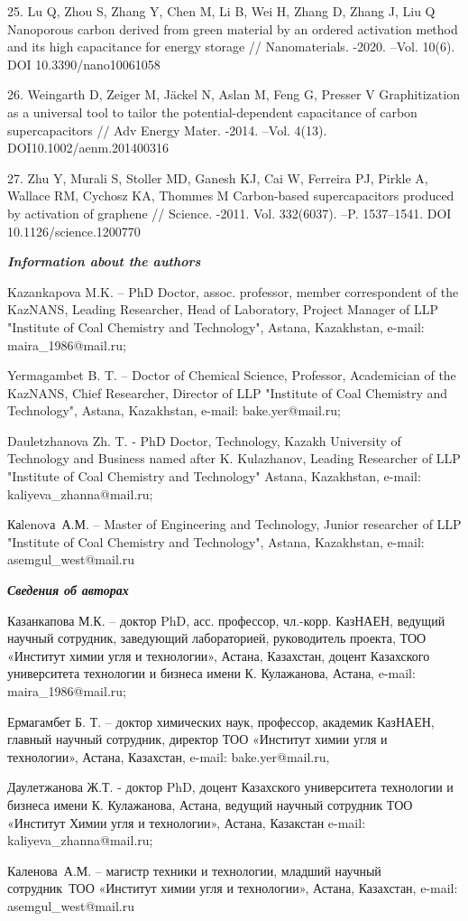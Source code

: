 25. Lu Q, Zhou S, Zhang Y, Chen M, Li B, Wei H, Zhang D, Zhang J, Liu Q
Nanoporous carbon derived from green material by an ordered activation
method and its high capacitance for energy storage // Nanomaterials.
-2020. --Vol. 10(6). DOI 10.3390/nano10061058

26. Weingarth D, Zeiger M, Jäckel N, Aslan M, Feng G, Presser V
Graphitization as a universal tool to tailor the potential-dependent
capacitance of carbon supercapacitors // Adv Energy Mater. -2014. --Vol.
4(13). DOI10.1002/aenm.201400316

27. Zhu Y, Murali S, Stoller MD, Ganesh KJ, Cai W, Ferreira PJ, Pirkle
A, Wallace RM, Cychosz KA, Thommes M Carbon-based supercapacitors
produced by activation of graphene // Science. -2011. Vol. 332(6037).
--P. 1537--1541. DOI 10.1126/science.1200770

\emph{{\bfseries Information about the authors}}

Kazankapova M.K. -- PhD Doctor, assoc. professor, member correspondent
of the KazNANS, Leading Researcher, Head of Laboratory, Project Manager
of LLP "Institute of Coal Chemistry and Technology", Astana, Kazakhstan,
e-mail: maira\_1986@mail.ru;

Yermagambet B. T. -- Doctor of Chemical Science, Professor, Academician
of the KazNANS, Chief Researcher, Director of LLP "Institute of Coal
Chemistry and Technology", Astana, Kazakhstan, e-mail: bake.yer@mail.ru;

Dauletzhanova Zh. T. - PhD Doctor, Technology, Kazakh University of
Technology and Business named after K. Kulazhanov, Leading Researcher of
LLP "Institute of Coal Chemistry and Technology" Astana, Kazakhstan,
e-mail: kaliyeva\_zhanna@mail.ru;

Каlenovа~А.М. -- Master of Engineering and Technology, Junior researcher
of LLP "Institute of Coal Chemistry and Technology", Astana, Kazakhstan,
e-mail: asemgul\_west@mail.ru ~

\emph{{\bfseries Сведения об авторах}}

Казанкапова М.К. -- доктор PhD, асс. профессор, чл.-корр. КазНАЕН,
ведущий научный сотрудник, заведующий лабораторией, руководитель
проекта, ТОО «Институт химии угля и технологии», Астана, Казахстан,
доцент Казахского университета технологии и бизнеса имени К. Кулажанова,
Астана, e-mail: maira\_1986@mail.ru;

Ермагамбет Б. Т. -- доктор химических наук, профессор, академик КазНАЕН,
главный научный сотрудник, директор ТОО «Институт химии угля и
технологии», Астана, Казахстан, e-mail: bake.yer@mail.ru,

Даулетжанова Ж.Т. - доктор PhD, доцент Казахского университета
технологии и бизнеса имени К. Кулажанова, Астана, ведущий научный
сотрудник ТОО «Институт Химии угля и технологии», Астана, Казакстан
e-mail: kaliyeva\_zhanna@mail.ru;

Каленова~А.М. -- магистр техники и технологии, младший научный
сотрудник~ТОО «Институт химии угля и технологии», Астана, Казахстан,
e-mail: asemgul\_west@mail.ru~ ~
